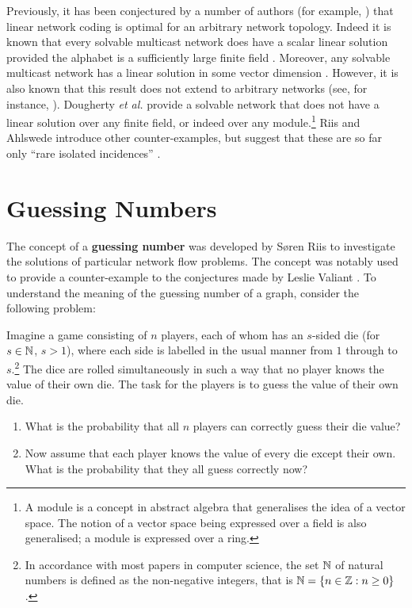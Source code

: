 Previously, it has been conjectured by a number of authors (for example, \cite{meda2003, bary2006}) that linear network coding is optimal for an arbitrary network topology. Indeed it is known that every solvable multicast network does have a scalar linear solution provided the alphabet is a sufficiently large finite field \cite{liye2003}. Moreover, any solvable multicast network has a linear solution in some vector dimension \cite{riis2004}. However, it is also known that this result does not extend to arbitrary networks (see, for instance, \cite{lehm2003}). Dougherty \textit{et al.} \cite{doug2005} provide a solvable network that does not have a linear solution over any finite field, or indeed over any module.\footnote{A module is a concept in abstract algebra that generalises the idea of a vector space. The notion of a vector space being expressed over a field is also generalised; a module is expressed over a ring.} Riis and Ahlswede introduce other counter-examples, but suggest that these are so far only ``rare isolated incidences'' \cite{riah2004}.

\section{Guessing Numbers}
\label{sect:guessing_number}

The concept of a \textbf{guessing number} was developed by S{\o}ren Riis \cite{riis2005util, riis2005info} to investigate the solutions of particular network flow problems. The concept was notably used to provide a counter-example \cite{riis2005info} to the conjectures made by Leslie Valiant \cite{vali1975}. To understand the meaning of the guessing number of a graph, consider the following problem:

Imagine a game consisting of $n$ players, each of whom has an $s$-sided die (for $s \in \mathbb{N}$, $s > 1$), where each side is labelled in the usual manner from $1$ through to $s$.\footnote{In accordance with most papers in computer science, the set $\mathbb{N}$ of natural numbers is defined as the non-negative integers, that is $\mathbb{N} = \{ n \in \mathbb{Z} : n \geq 0 \}$.} The dice are rolled simultaneously in such a way that no player knows the value of their own die. The task for the players is to guess the value of their own die.

\begin{enumerate}
	\item What is the probability that all $n$ players can correctly guess their die value?
	
	\item Now assume that each player knows the value of every die except their own. What is the probability that they all guess correctly now?
\end{enumerate}

